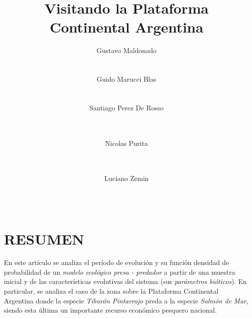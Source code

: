 \documentclass{SPANISH_acm_proc_article-sp}
\begin{document}
\title{Visitando la Plataforma Continental Argentina}
\subtitle{}


\author
{
	\alignauthor
    Gustavo Maldonado \\
	 \\
	\\
	\alignauthor
	Guido Marucci Blas \\
     \\
	\\
	\alignauthor	
    Santiago Perez De Rosso \\
     \\
	\\
	\and
	\alignauthor
	Nicolas Purita \\
     \\
	\\
	\and
    \alignauthor
    Luciano Zemin \\
     \\
	\\
}

\maketitle

\section*{RESUMEN}
En este art\'iculo se analiza el per\'iodo de evoluci\'on y su funci\'on densidad de 
probabilidad de un \emph{modelo ecol\'ogico presa - predador} a partir de una muestra
inicial y de las caracter\'isticas evolutivas del sistema (sus \emph{par\'ametros bi\'oticos}).
En particular, se analiza el caso de la zona sobre la Plataforma Continental Argentina
donde la especie \textit{Tibur\'on Pintarrojo} preda a la especie \textit{Salm\'on de Mar},
siendo esta \'ultima un importante recurso econ\'omico pesquero nacional.
\end{document}
